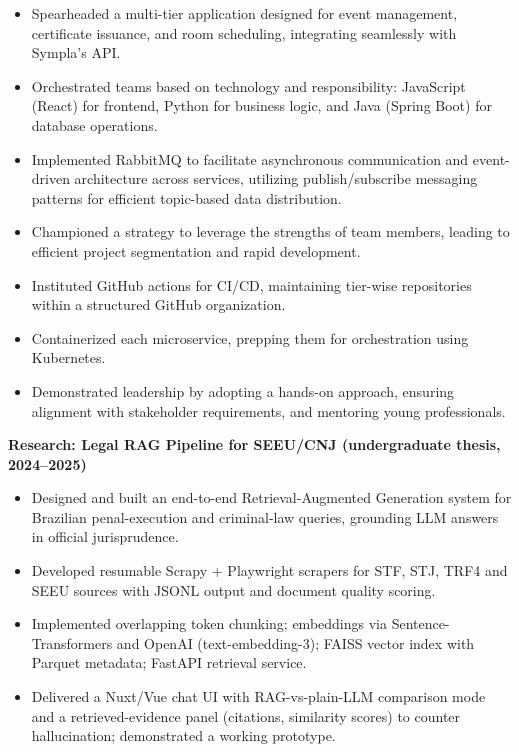 \documentclass[10pt,a4paper]{altacv}
\begin{document}
\begin{itemize}
    \setlength{\itemindent}{0.5em}
    \item[--] Spearheaded a multi-tier application designed for event management, certificate issuance, and room scheduling, integrating seamlessly with Sympla's API.
    \item[--] Orchestrated teams based on technology and responsibility: JavaScript (React) for frontend, Python for business logic, and Java (Spring Boot) for database operations.
    \item[--] Implemented RabbitMQ to facilitate asynchronous communication and event-driven architecture across services, utilizing publish/subscribe messaging patterns for efficient topic-based data distribution.
    \item[--] Championed a strategy to leverage the strengths of team members, leading to efficient project segmentation and rapid development.
    \item[--] Instituted GitHub actions for CI/CD, maintaining tier-wise repositories within a structured GitHub organization.
    \item[--] Containerized each microservice, prepping them for orchestration using Kubernetes.
    \item[--] Demonstrated leadership by adopting a hands-on approach, ensuring alignment with stakeholder requirements, and mentoring young professionals.
\end{itemize}

\textbf{Research: Legal RAG Pipeline for SEEU/CNJ (undergraduate thesis, 2024--2025)}
\begin{itemize}
    \setlength{\itemindent}{0.5em}
    \item[--] Designed and built an end-to-end Retrieval-Augmented Generation system for Brazilian penal-execution and criminal-law queries, grounding LLM answers in official jurisprudence.
    \item[--] Developed resumable Scrapy + Playwright scrapers for STF, STJ, TRF4 and SEEU sources with JSONL output and document quality scoring.
    \item[--] Implemented overlapping token chunking; embeddings via Sentence-Transformers and OpenAI (text-embedding-3); FAISS vector index with Parquet metadata; FastAPI retrieval service.
    \item[--] Delivered a Nuxt/Vue chat UI with RAG-vs-plain-LLM comparison mode and a retrieved-evidence panel (citations, similarity scores) to counter hallucination; demonstrated a working prototype.
\end{itemize}
\end{document}
